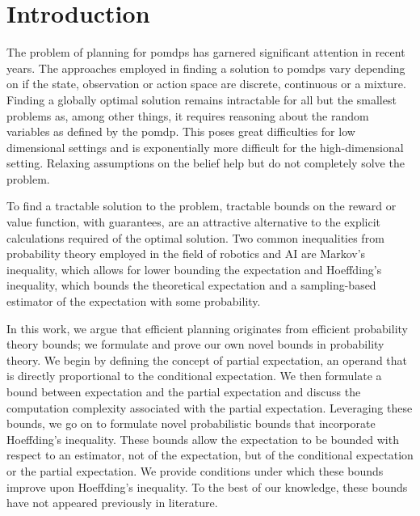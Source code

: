 \chapter{Introduction}\label{sec:intro}

The problem of planning for \glspl{pomdp} has garnered significant attention in recent years. The approaches employed in finding a solution to \glspl{pomdp} vary depending on if the state, observation or action space are discrete, continuous or a mixture. Finding a globally optimal solution remains intractable for all but the smallest problems as, among other things, it requires reasoning about the random variables as defined by the \gls{pomdp}. This poses great difficulties for low dimensional settings and is exponentially more difficult for the high-dimensional setting. Relaxing assumptions on the belief help but do not completely solve the problem.

To find a tractable solution to the problem, tractable bounds on the reward or value function, with guarantees, are an attractive alternative to the explicit calculations required of the optimal solution. Two common inequalities from probability theory employed in the field of robotics and AI are Markov's inequality, which allows for lower bounding the expectation and Hoeffding's inequality, which bounds the theoretical expectation and a sampling-based estimator of the expectation with some probability.

In this work, we argue that efficient planning originates from efficient probability theory bounds; we formulate and prove our own novel bounds in probability theory. We begin by defining the concept of partial expectation, an operand that is directly proportional to the conditional expectation. We then formulate a bound between expectation and the partial expectation and discuss the computation complexity associated with the partial expectation. Leveraging these bounds, we go on to formulate novel probabilistic bounds that incorporate Hoeffding's inequality. These bounds allow the expectation to be bounded with respect to an estimator, not of the expectation, but of the conditional expectation or the partial expectation. We provide conditions under which these bounds improve upon Hoeffding's inequality. To the best of our knowledge, these bounds have not appeared previously in literature.

